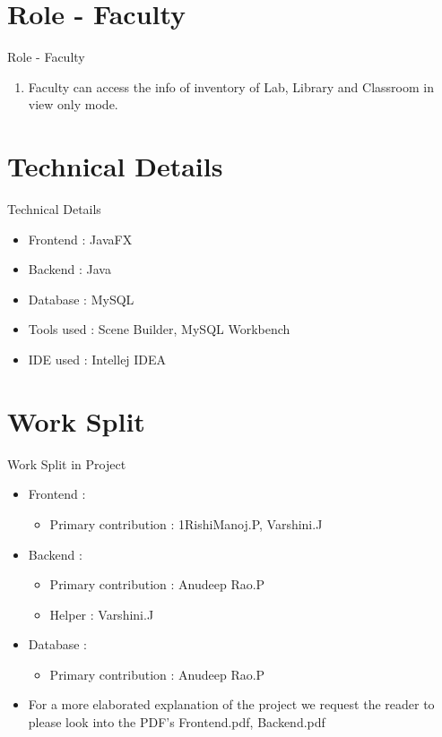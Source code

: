 \documentclass{beamer}
\begin{document}
\section{Role - Faculty}
\begin{frame}{Role - Faculty}
    \begin{enumerate}[]
        \item Faculty can access the info of inventory of Lab, Library and Classroom in view only mode.
    \end{enumerate}
\end{frame}

\section{Technical Details}
\begin{frame}{Technical Details}
\begin{itemize}
\item Frontend : JavaFX 
\item Backend : Java
\item Database : MySQL 
\item Tools used : Scene Builder, MySQL Workbench
\item IDE used : Intellej IDEA
\end{itemize}
\end{frame}

\section{Work Split}
\begin{frame}{Work Split in Project}
\begin{itemize}
\item Frontend : 
	\begin{itemize}
	\item Primary contribution : 1RishiManoj.P, Varshini.J
	\end{itemize}
\item Backend :
\begin{itemize}
\item Primary contribution : Anudeep Rao.P 
\item Helper : Varshini.J
\end{itemize}

\item Database : 
\begin{itemize}
\item Primary contribution : Anudeep Rao.P
\end{itemize}

\end{itemize}
\end{frame}

\begin{frame}{}
\begin{itemize}
\item For a more elaborated explanation of the project we request the reader to please look into the PDF's Frontend.pdf, Backend.pdf
\end{itemize}
\end{frame}
\end{document}
